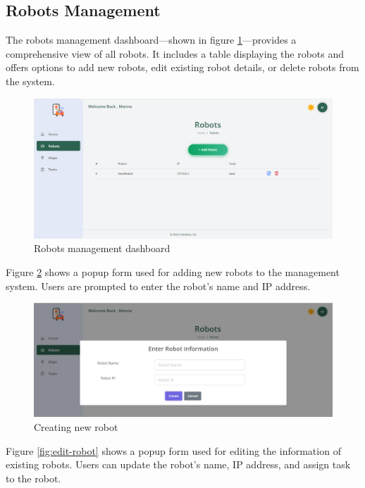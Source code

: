 \subsection{Robots Management}

    The robots management dashboard---shown in figure \ref{fig:robots-dashboard}---provides a comprehensive view of all robots. It includes a table displaying the robots and offers options to add new robots, edit existing robot details, or delete robots from the system.

    \begin{figure}[h!]
        \centering
        \includegraphics[scale=0.31]{./Figures/WebApp/Robots.png}
        \caption{Robots management dashboard}
        \label{fig:robots-dashboard}
    \end{figure}

\newpage
    Figure \ref{fig:create-robot} shows a popup form used for adding new robots to the management system. Users are prompted to enter the robot's name and IP address.

    \begin{figure}[h!]
        \centering
        \includegraphics[scale=0.4]{./Figures/WebApp/createRobot.png}
        \caption{Creating new robot}
        \label{fig:create-robot}
    \end{figure}

    Figure \ref{fig:edit-robot} shows a popup form used for editing the information of existing robots. Users can update the robot's name, IP address, and assign task to the robot.

